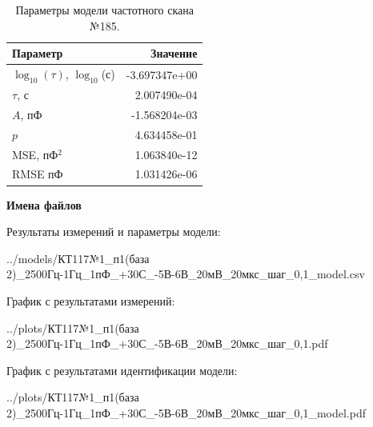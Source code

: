 \begin{table}[!ht]
    \centering
    \caption{Параметры модели частотного скана №185.}
    \begin{tabular}{|l|r|}
        \hline
        Параметр                                       & Значение                  \\ \hline
        $\log_{10}(\tau)$, $\log_{10}$(с)              & -3.697347e+00             \\ \hline
        $\tau$, с                                      & 2.007490e-04              \\ \hline
        $A$, пФ                                        & -1.568204e-03             \\ \hline
        $p$                                            & 4.634458e-01              \\ \hline
        MSE, пФ$^2$                                    & 1.063840e-12              \\ \hline
        RMSE пФ                                        & 1.031426e-06              \\ \hline
    \end{tabular}
    \label{table:frequency_scan_model_185}
\end{table}

\textbf{Имена файлов}

Результаты измерений и параметры модели:

\scriptsize../models/КТ117№1\_п1(база 2)\_2500Гц-1Гц\_1пФ\_+30С\_-5В-6В\_20мВ\_20мкс\_шаг\_0,1\_model.csv
\normalsize

График с результатами измерений:

\scriptsize../plots/КТ117№1\_п1(база 2)\_2500Гц-1Гц\_1пФ\_+30С\_-5В-6В\_20мВ\_20мкс\_шаг\_0,1.pdf
\normalsize

График с результатами идентификации модели:

\scriptsize../plots/КТ117№1\_п1(база 2)\_2500Гц-1Гц\_1пФ\_+30С\_-5В-6В\_20мВ\_20мкс\_шаг\_0,1\_model.pdf
\normalsize

